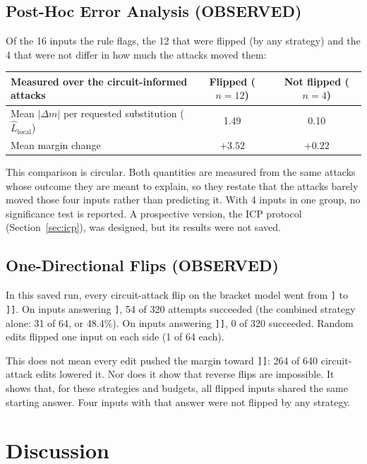 \documentclass[11pt]{article}
\newcommand{\lab}[1]{{\footnotesize\MakeUppercase{#1}}}
\newcommand{\observed}{\lab{observed}}
\newcommand{\rb}{\texttt{]}}
\newcommand{\rbb}{\texttt{]]}}
\newcommand{\Lhat}{\hat{L}}
\begin{document}
\subsection{Post-Hoc Error Analysis (\observed)}
Of the 16 inputs the rule flags, the 12 that were flipped (by any strategy) and the 4 that were not differ in how much the attacks moved them:
\begin{center}
\small
\begin{tabular}{@{}lcc@{}}
\toprule
Measured over the circuit-informed attacks & Flipped ($n=12$) & Not flipped ($n=4$) \\
\midrule
Mean $|\Delta m|$ per requested substitution ($\Lhat_{\mathrm{local}}$) & 1.49 & 0.10 \\
Mean margin change & $+3.52$ & $+0.22$ \\
\bottomrule
\end{tabular}
\end{center}
This comparison is circular. Both quantities are measured from the same attacks whose outcome they are meant to explain, so they restate that the attacks barely moved those four inputs rather than predicting it. With 4 inputs in one group, no significance test is reported. A prospective version, the ICP protocol (Section~\ref{sec:icp}), was designed, but its results were not saved.

\subsection{One-Directional Flips (\observed)}\label{sec:oneway}
In this saved run, every circuit-attack flip on the bracket model went from \rb{} to \rbb{}. On inputs answering \rb{}, 54 of 320 attempts succeeded (the combined strategy alone: 31 of 64, or 48.4\%). On inputs answering \rbb{}, 0 of 320 succeeded. Random edits flipped one input on each side (1 of 64 each).

This does not mean every edit pushed the margin toward \rbb{}: 264 of 640 circuit-attack edits lowered it. Nor does it show that reverse flips are impossible. It shows that, for these strategies and budgets, all flipped inputs shared the same starting answer. Four inputs with that answer were not flipped by any strategy.

\section{Discussion}
\end{document}
